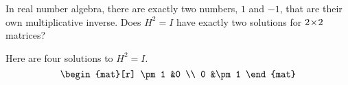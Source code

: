 
\begin{Exercise}[
name={},
title={}, 
difficulty=0,
origin={\cite{JH}}]
    In real number algebra, there are exactly two numbers, $1$ and $-1$, 
    that are their own multiplicative inverse.
    Does \( H^2=I \) have exactly two solutions for \( 2 \! \times \! 2 \)
    matrices?
\end{Exercise}
\begin{Answer}
      Here are four solutions to \( H^2=I \).
      \begin{equation*}
        \begin{mat}[r]
          \pm 1  &0  \\
          0      &\pm 1
        \end{mat}
      \end{equation*}   
\end{Answer}
